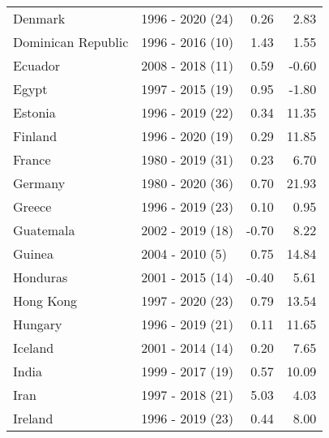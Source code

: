 \begin{table}[pos=h]
{{\begin{tabular}{llrr}
\addlinespace
Denmark & 1996 - 2020 (24) & 0.26 & 2.83\\
Dominican Republic & 1996 - 2016 (10) & 1.43 & 1.55\\
Ecuador & 2008 - 2018 (11) & 0.59 & -0.60\\
Egypt & 1997 - 2015 (19) & 0.95 & -1.80\\
Estonia & 1996 - 2019 (22) & 0.34 & 11.35\\
\addlinespace
Finland & 1996 - 2020 (19) & 0.29 & 11.85\\
France & 1980 - 2019 (31) & 0.23 & 6.70\\
Germany & 1980 - 2020 (36) & 0.70 & 21.93\\
Greece & 1996 - 2019 (23) & 0.10 & 0.95\\
Guatemala & 2002 - 2019 (18) & -0.70 & 8.22\\
\addlinespace
Guinea & 2004 - 2010 (5) & 0.75 & 14.84\\
Honduras & 2001 - 2015 (14) & -0.40 & 5.61\\
Hong Kong & 1997 - 2020 (23) & 0.79 & 13.54\\
Hungary & 1996 - 2019 (21) & 0.11 & 11.65\\
Iceland & 2001 - 2014 (14) & 0.20 & 7.65\\
\addlinespace
India & 1999 - 2017 (19) & 0.57 & 10.09\\
Iran & 1997 - 2018 (21) & 5.03 & 4.03\\
Ireland & 1996 - 2019 (23) & 0.44 & 8.00\\
\bottomrule \end{tabular}
}

}
\end{table}
